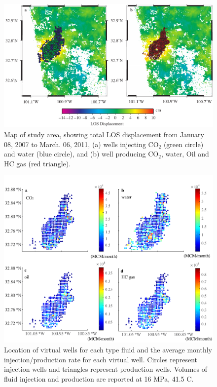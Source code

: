 \clearpage
\begin{figure}
	\centering
	\includegraphics[width=\textwidth]{figs_paper3/Fig5.pdf}	
	\caption{Map of study area, showing total LOS displacement from January 08, 2007 to March. 06, 2011, (a) wells injecting CO$_{2}$ (green circle) and water (blue circle), and (b) well producing CO$_{2}$, water, Oil and HC gas (red triangle).}
	\label{fig:chpt5_fig5}
\end{figure}

\clearpage
\begin{figure}
	\centering
	\includegraphics{figs_paper3/Fig6.pdf}	
	\caption[Location of virtual wells for each type fluid and the average monthly injection/production rate for each virtual well.]{Location of virtual wells for each type fluid and the average monthly injection/production rate for each virtual well.  Circles represent injection wells and triangles represent production wells.  Volumes of fluid injection and production are reported at 16 MPa, 41.5 \textordmasculine C.}
	\label{fig:chpt5_fig6}
\end{figure}

